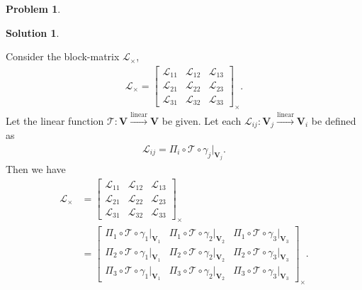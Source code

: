 \documentclass{book}
\theoremstyle{definition}
\newtheorem*{prob*}{Problem}
\newtheorem*{sln*}{Solution}
\newcommand{\V}{\mathbf{V}}
\newcommand{\lag}{\mathcal{L}}
\newcommand{\lin}{\overset{\text{linear}}{\longrightarrow}}
\newcommand{\T}{\mathcal{T}}
\begin{document}
\begin{prob*}
\begin{sln*}
\begin{enumerate}
\begin{enumerate}
			Consider the block-matrix $\lag_\times$,
			\begin{align*}
			\lag_\times = \begin{bmatrix}
			\lag_{11} & \lag_{12} & \lag_{13}\\
			\lag_{21} & \lag_{22} & \lag_{23}\\
			\lag_{31} & \lag_{32} & \lag_{33} 
			\end{bmatrix}_\times.
			\end{align*}
			Let the linear function $\T : \V \lin \V$ be given. Let each $\lag_{ij} : \V_j \lin \V_i$ be defined as
			\begin{align*}
			\lag_{ij} = \Pi_i \circ \T \circ \gamma_j\bigg\vert_{\V_j}.
			\end{align*}
			Then we have
			\begin{align*}
			\lag_\times &= \begin{bmatrix}
			\lag_{11} & \lag_{12} & \lag_{13}\\
			\lag_{21} & \lag_{22} & \lag_{23}\\
			\lag_{31} & \lag_{32} & \lag_{33} 
			\end{bmatrix}_\times\\
			&=
			\begin{bmatrix}
			\Pi_1 \circ \T \circ \gamma_1\bigg\vert_{\V_1} & \Pi_1 \circ \T \circ \gamma_2\bigg\vert_{\V_2} & \Pi_1 \circ \T \circ \gamma_3\bigg\vert_{\V_3}\\
			\Pi_2 \circ \T \circ \gamma_1\bigg\vert_{\V_1} & \Pi_2 \circ \T \circ \gamma_2\bigg\vert_{\V_2} & \Pi_2 \circ \T \circ \gamma_3\bigg\vert_{\V_3}\\
			\Pi_3 \circ \T \circ \gamma_1\bigg\vert_{\V_1} & \Pi_3 \circ \T \circ \gamma_2\bigg\vert_{\V_2} & \Pi_3 \circ \T \circ \gamma_3\bigg\vert_{\V_3} 
			\end{bmatrix}_\times.
			\end{align*}
			
			
			

\end{enumerate}
\end{enumerate}
\end{sln*}
\end{prob*}
\end{document}
